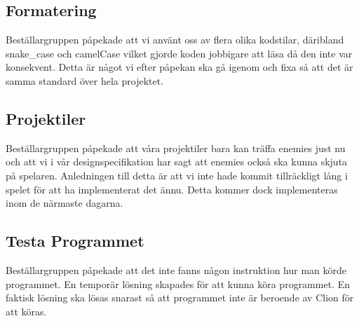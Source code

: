 \documentclass{TDP005mall}
\begin{document}
\subsection{Formatering}
Beställargruppen påpekade att vi använt oss av flera olika kodstilar,
däribland snake\_case och camelCase vilket gjorde koden jobbigare att läsa då den inte var konsekvent.
Detta är något vi efter påpekan ska gå igenom och fixa så att det är samma standard över hela projektet.

\subsection{Projektiler}
Beställargruppen påpekade att våra projektiler bara kan träffa enemies just nu och att vi i vår designspecifikation har sagt att enemies också ska kunna skjuta på spelaren.
Anledningen till detta är att vi inte hade kommit tillräckligt lång i spelet för att ha implementerat det ännu.
Detta kommer dock implementeras inom de närmaste dagarna.

\subsection{Testa Programmet}
Beställargruppen påpekade att det inte fanns någon instruktion hur man körde programmet.
En temporär lösning skapades för att kunna köra programmet.
En faktisk lösning ska lösas snarast så att programmet inte är beroende av Clion för att köras.
\end{document}
